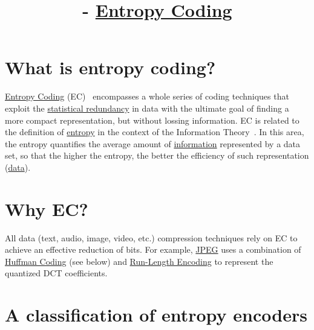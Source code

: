 




\title{\SM{} - \href{https://github.com/Sistemas-Multimedia/Sistemas-Multimedia.github.io/tree/master/contents/entropy_coding}{Entropy Coding}}

\maketitle

\tableofcontents

\section{What is entropy coding?}

\href{https://en.wikipedia.org/wiki/Entropy_coding}{Entropy Coding}
(EC)~\cite{vruiz__entropy_coding} encompasses a whole series of coding
techniques that exploit the
\href{https://en.wikipedia.org/wiki/Redundancy_(information_theory)}{statistical
  redundancy} in data with the ultimate goal of finding a more compact
representation, but without lossing information. EC is related to the definition of
\href{https://en.wikipedia.org/wiki/Entropy_(information_theory)}{entropy}
in the context of the Information
Theory~\cite{vruiz__information_theory}. In this area, the entropy
quantifies the average amount of
\href{https://en.wikipedia.org/wiki/Information}{information}
represented by a data set, so that the higher the entropy, the better
the efficiency of such representation
(\href{https://en.wikipedia.org/wiki/Data}{data}).

\section{Why EC?}
All data (text, audio, image, video, etc.) compression techniques rely
on EC to achieve an effective reduction of bits. For example,
\href{https://en.wikipedia.org/wiki/JPEG}{JPEG} uses a combination of
\href{https://en.wikipedia.org/wiki/Huffman_coding}{Huffman Coding}
(see below) and
\href{https://en.wikipedia.org/wiki/Run-length_encoding}{Run-Length
  Encoding} to represent the quantized DCT coefficients.

\section{A classification of entropy encoders}

